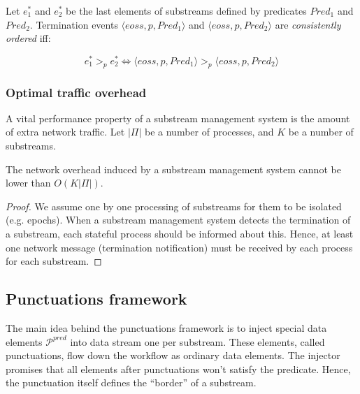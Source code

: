 Let $e^{*}_1$ and $e^{*}_2$ be the last elements of substreams defined by predicates $Pred_1$ and $Pred_2$. Termination events $\langle eoss, p, Pred_1\rangle$ and $\langle eoss, p, Pred_2\rangle$ are {\em consistently ordered} iff:

\begin{equation}
e^{*}_1 >_p e^{*}_2 \Leftrightarrow \langle eoss, p, Pred_1\rangle >_p \langle eoss, p, Pred_2\rangle
\end{equation}

\subsubsection{Optimal traffic overhead}

A vital performance property of a substream management system is the amount of extra network traffic. Let $|\Pi|$ be a number of processes, and $K$ be a number of substreams. 

\begin{lemma}
The network overhead induced by a substream management system cannot be lower than $O(K|\Pi|)$. 
\end{lemma}
\begin{proof}
We assume one by one processing of substreams for them to be isolated (e.g. epochs). When a substream management system detects the termination of a substream, each stateful process should be informed about this. Hence, at least one network message (termination notification) must be received by each process for each substream.
\end{proof}


\subsection{Punctuations framework}
\label{fs-acker-punctuations}

The main idea behind the punctuations framework is to inject special data elements $\mathcal{P}^{pred}$ into data stream one per substream. These elements, called punctuations, flow down the workflow as ordinary data elements. The injector promises that all elements after punctuations won't satisfy the predicate. Hence, the punctuation itself defines the ``border'' of a substream.

